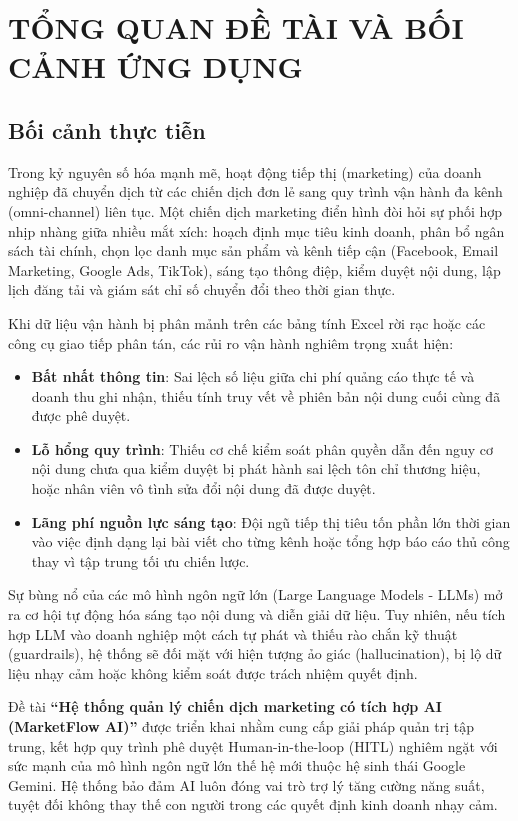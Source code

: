 \chapter{TỔNG QUAN ĐỀ TÀI VÀ BỐI CẢNH ỨNG DỤNG}

\section{Bối cảnh thực tiễn}

Trong kỷ nguyên số hóa mạnh mẽ, hoạt động tiếp thị (marketing) của doanh nghiệp đã chuyển dịch từ các chiến dịch đơn lẻ sang quy trình vận hành đa kênh (omni-channel) liên tục. Một chiến dịch marketing điển hình đòi hỏi sự phối hợp nhịp nhàng giữa nhiều mắt xích: hoạch định mục tiêu kinh doanh, phân bổ ngân sách tài chính, chọn lọc danh mục sản phẩm và kênh tiếp cận (Facebook, Email Marketing, Google Ads, TikTok), sáng tạo thông điệp, kiểm duyệt nội dung, lập lịch đăng tải và giám sát chỉ số chuyển đổi theo thời gian thực.

Khi dữ liệu vận hành bị phân mảnh trên các bảng tính Excel rời rạc hoặc các công cụ giao tiếp phân tán, các rủi ro vận hành nghiêm trọng xuất hiện:
\begin{itemize}
  \item \textbf{Bất nhất thông tin}: Sai lệch số liệu giữa chi phí quảng cáo thực tế và doanh thu ghi nhận, thiếu tính truy vết về phiên bản nội dung cuối cùng đã được phê duyệt.
  \item \textbf{Lỗ hổng quy trình}: Thiếu cơ chế kiểm soát phân quyền dẫn đến nguy cơ nội dung chưa qua kiểm duyệt bị phát hành sai lệch tôn chỉ thương hiệu, hoặc nhân viên vô tình sửa đổi nội dung đã được duyệt.
  \item \textbf{Lãng phí nguồn lực sáng tạo}: Đội ngũ tiếp thị tiêu tốn phần lớn thời gian vào việc định dạng lại bài viết cho từng kênh hoặc tổng hợp báo cáo thủ công thay vì tập trung tối ưu chiến lược.
\end{itemize}

Sự bùng nổ của các mô hình ngôn ngữ lớn (Large Language Models - LLMs) mở ra cơ hội tự động hóa sáng tạo nội dung và diễn giải dữ liệu. Tuy nhiên, nếu tích hợp LLM vào doanh nghiệp một cách tự phát và thiếu rào chắn kỹ thuật (guardrails), hệ thống sẽ đối mặt với hiện tượng ảo giác (hallucination), bị lộ dữ liệu nhạy cảm hoặc không kiểm soát được trách nhiệm quyết định.

Đề tài \textbf{“Hệ thống quản lý chiến dịch marketing có tích hợp AI (MarketFlow AI)”} được triển khai nhằm cung cấp giải pháp quản trị tập trung, kết hợp quy trình phê duyệt Human-in-the-loop (HITL) nghiêm ngặt với sức mạnh của mô hình ngôn ngữ lớn thế hệ mới thuộc hệ sinh thái Google Gemini. Hệ thống bảo đảm AI luôn đóng vai trò trợ lý tăng cường năng suất, tuyệt đối không thay thế con người trong các quyết định kinh doanh nhạy cảm.

